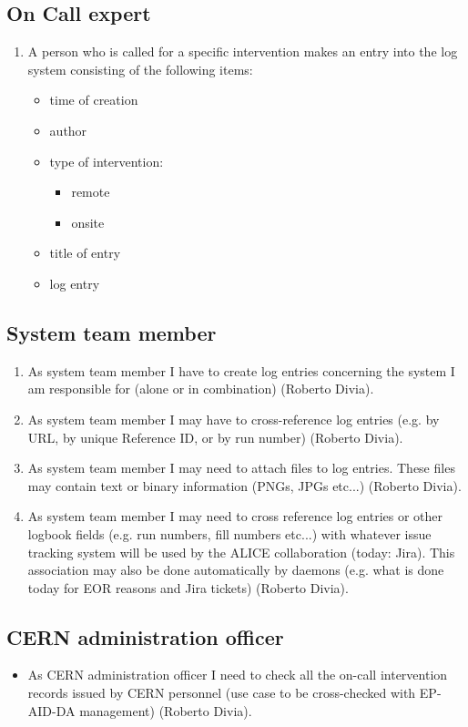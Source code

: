 \subsection{On Call expert}
\begin{enumerate}
  \item A person who is called for a specific intervention makes an entry into the log system consisting of the following items:
  \begin{itemize}
    \item time of creation
    \item author
    \item type of intervention:
    \begin{itemize}
      \item remote
      \item onsite
    \end{itemize}
    \item title of entry
    \item log entry
  \end{itemize}
\end{enumerate}

\subsection{System team member}
\begin{enumerate}
  \item As system team member I have to create log entries concerning the system I am responsible for (alone or in combination) (Roberto Divia).
  \item As system team member I may have to cross-reference log entries (e.g. by URL, by unique Reference ID, or by run number)  (Roberto Divia).
  \item  As system team member I may need to attach files to log entries. These files may contain text or binary information (PNGs, JPGs etc...) (Roberto Divia).
  \item As system team member I may need to cross reference log entries or other logbook fields (e.g. run numbers, fill numbers etc...) with whatever issue tracking system will be used by the ALICE collaboration (today: Jira). This association may also be done automatically by daemons (e.g. what is done today for EOR reasons and Jira tickets) (Roberto Divia).
\end{enumerate}

\subsection{CERN administration officer}
\begin{itemize}
  \item As CERN administration officer I need to check all the on-call intervention records issued by CERN personnel (use case to be cross-checked with EP-AID-DA management) (Roberto Divia).
\end{itemize}

